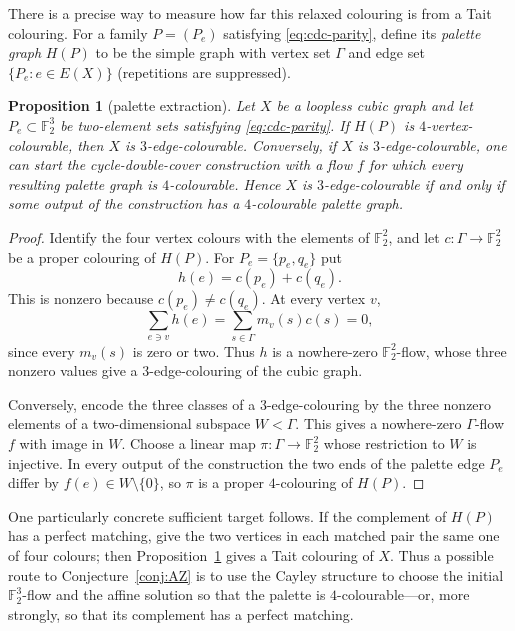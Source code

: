 \documentclass[11pt,a4paper]{article}
\newtheorem{proposition}[theorem]{Proposition}
\theoremstyle{definition}
\theoremstyle{remark}
\begin{document}
There is a precise way to measure how far this relaxed colouring is from a Tait colouring.  For a family $P=(P_e)$ satisfying \eqref{eq:cdc-parity}, define its \emph{palette graph} $H(P)$ to be the simple graph with vertex set $\Gamma$ and edge set $\{P_e:e\in E(X)\}$ (repetitions are suppressed).

\begin{proposition}[palette extraction]\label{prop:palette}
Let $X$ be a loopless cubic graph and let $P_e\subset\mathbb F_2^3$ be two-element sets satisfying \eqref{eq:cdc-parity}.  If $H(P)$ is $4$-vertex-colourable, then $X$ is $3$-edge-colourable.  Conversely, if $X$ is $3$-edge-colourable, one can start the cycle-double-cover construction with a flow $f$ for which every resulting palette graph is $4$-colourable.  Hence $X$ is $3$-edge-colourable if and only if some output of the construction has a $4$-colourable palette graph.
\end{proposition}
\begin{proof}
Identify the four vertex colours with the elements of $\mathbb F_2^2$, and let $c\colon\Gamma\to\mathbb F_2^2$ be a proper colouring of $H(P)$.  For $P_e=\{p_e,q_e\}$ put
\[
 h(e)=c(p_e)+c(q_e).
\]
This is nonzero because $c(p_e)\ne c(q_e)$.  At every vertex $v$,
\[
 \sum_{e\ni v}h(e)
 =\sum_{s\in\Gamma}m_v(s)c(s)=0,
\]
since every $m_v(s)$ is zero or two.  Thus $h$ is a nowhere-zero $\mathbb F_2^2$-flow, whose three nonzero values give a $3$-edge-colouring of the cubic graph.

Conversely, encode the three classes of a $3$-edge-colouring by the three nonzero elements of a two-dimensional subspace $W<\Gamma$.  This gives a nowhere-zero $\Gamma$-flow $f$ with image in $W$.  Choose a linear map $\pi\colon\Gamma\to\mathbb F_2^2$ whose restriction to $W$ is injective.  In every output of the construction the two ends of the palette edge $P_e$ differ by $f(e)\in W\setminus\{0\}$, so $\pi$ is a proper $4$-colouring of $H(P)$.
\end{proof}

One particularly concrete sufficient target follows.  If the complement of $H(P)$ has a perfect matching, give the two vertices in each matched pair the same one of four colours; then Proposition~\ref{prop:palette} gives a Tait colouring of $X$.  Thus a possible route to Conjecture~\ref{conj:AZ} is to use the Cayley structure to choose the initial $\mathbb F_2^3$-flow and the affine solution so that the palette is $4$-colourable---or, more strongly, so that its complement has a perfect matching.
\end{document}
